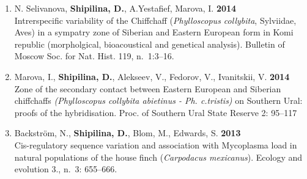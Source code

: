\documentclass[10pt]{article}
\begin{document}
\begin{cv}
\begin{enumerate}
          \item  N. Selivanova, \textbf{Shipilina, D.}, A.Yestafief, Marova, I. \textbf{2014}\\
            	Intrerspecific variability of the Chiffchaff (\textit{Phylloscopus collybita}, Sylviidae, Aves) in a sympatry zone of Siberian and Eastern European form in Komi republic  (morpholgical, bioacoustical and genetical analysis). Bulletin of Moscow Soc. for Nat. Hist. 119, n.~1:3--16. %
  
	\item Marova, I., \textbf{Shipilina, D.}, Alekseev, V., Fedorov, V., Ivanitskii, V. \textbf{2014}\\
		Zone of the secondary contact between Eastern European and Siberian chiffchaffs \textit{(Phylloscopus collybita abietinus - Ph. c.tristis)} on Southern Ural: proofs of the hybridisation. Proc. of Southern Ural State Reserve 2: 95--117 %

	\item  Backstr{\"o}m, N., \textbf{Shipilina, D.}, Blom, M., Edwards, S. \textbf{2013}\\
	           Cis-regulatory sequence variation and association with Mycoplasma load in natural populations of the house finch (\textit{Carpodacus mexicanus}). Ecology and evolution 3., n.~3: 655--666.
    

\end{enumerate}
\end{cv}
\end{document}
